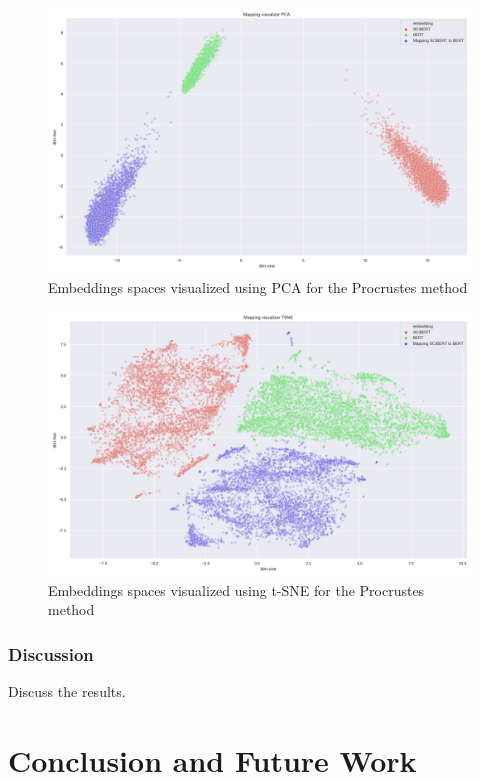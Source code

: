 \documentclass[12pt]{report}
\begin{document}
\begin{figure}[ht!]
\centering
\includegraphics[width=0.8\linewidth]{assets/addressing-change/mapping_vis_pca_SCIBERT_BERT_average.png}
\caption{Embeddings spaces visualized using PCA for the Procrustes method}
\label{fig:proc-pca}
\end{figure}

\begin{figure}[ht!]
\centering
\includegraphics[width=0.8\linewidth]{assets/addressing-change/mapping_vis_tsne_SCIBERT_BERT_average.png}
\caption{Embeddings spaces visualized using t-SNE for the Procrustes method}
\label{fig:proc-tsne}
\end{figure}

\subsection{Discussion}

Discuss the results.

\chapter{Conclusion and Future Work}



\end{document}
